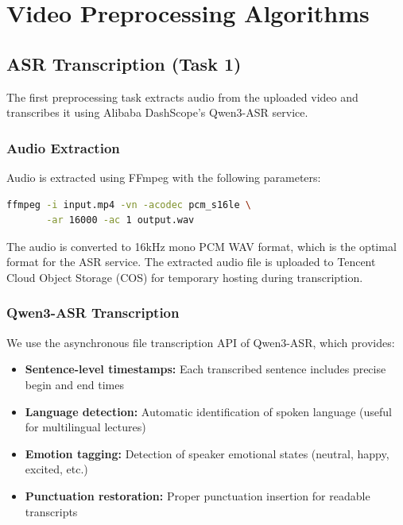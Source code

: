 \section{Video Preprocessing Algorithms}
\label{sec:preprocessing}

\subsection{ASR Transcription (Task 1)}

The first preprocessing task extracts audio from the uploaded video and transcribes it using Alibaba DashScope's Qwen3-ASR service.

\subsubsection{Audio Extraction}

Audio is extracted using FFmpeg with the following parameters:

\begin{lstlisting}[language=bash, caption={Audio Extraction Command}]
ffmpeg -i input.mp4 -vn -acodec pcm_s16le \
       -ar 16000 -ac 1 output.wav
\end{lstlisting}

The audio is converted to 16kHz mono PCM WAV format, which is the optimal format for the ASR service. The extracted audio file is uploaded to Tencent Cloud Object Storage (COS) for temporary hosting during transcription.

\subsubsection{Qwen3-ASR Transcription}

We use the asynchronous file transcription API of Qwen3-ASR, which provides:

\begin{itemize}
    \item \textbf{Sentence-level timestamps:} Each transcribed sentence includes precise begin and end times
    \item \textbf{Language detection:} Automatic identification of spoken language (useful for multilingual lectures)
    \item \textbf{Emotion tagging:} Detection of speaker emotional states (neutral, happy, excited, etc.)
    \item \textbf{Punctuation restoration:} Proper punctuation insertion for readable transcripts
\end{itemize}

